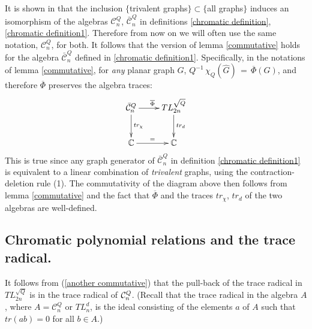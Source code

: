 \documentclass[11pt]{amsart}
\numberwithin{equation}{section}
\theoremstyle{definition}
\begin{document}
It is shown in \cite[Section 4]{FK} that the inclusion $\{$trivalent
graphs$\}\subset \{$all graphs$\}$ induces an isomorphism of the
algebras ${\mathcal C}^Q_n$, $\bar {\mathcal C}^Q_n$ in definitions \ref{chromatic definition},
\ref{chromatic
definition1}. Therefore from now on we will often use the same notation, ${\mathcal C}^Q_n$, for
both. It follows that the version of lemma \ref{commutative}
holds for the algebra $\bar{\mathcal C}^Q_n$ defined in \ref{chromatic
definition1}. Specifically, in the notations of lemma
\ref{commutative}, for {\em any} planar graph $G$, $Q^{-1}\,
{\chi}_Q(\widehat G)\, =\, \overline{\Phi}(G)$, and therefore $\overline{\Phi}$
preserves the algebra traces:
\begin{equation} \label{another commutative}
\xymatrix{ \bar{\mathcal C}_n^{\scriptsize Q}  \ar[d]^{tr_{\chi}} \ar[r]^{\overline{\Phi}} & TL_{2n}^{\sqrt Q}  \ar[d]^{tr_{d}}\\
{\mathbb C}\ar[r]^=  &  {\mathbb C} }\end{equation}
This is true since any graph generator of $\bar {\mathcal C}^Q_n$ in definition \ref{chromatic definition1} is equivalent
to a linear combination of {\em trivalent} graphs, using the contraction-deletion rule (1). The commutativity of the
diagram above then follows from lemma \ref{commutative} and the fact that $\overline{\Phi}$ and the traces ${tr_{\chi}}$,
$tr_{d}$ of the two algebras are well-defined.





\subsection{Chromatic polynomial relations and the trace radical.}
It follows from (\ref{another commutative}) that the pull-back of the trace radical in $TL_{2n}^{\sqrt Q}$ is in the
trace radical of ${\mathcal C}_n^{\scriptsize Q}$. (Recall that the trace radical in the algebra $A$,
where $A={\mathcal C}_n^Q$ or $TL^d_n$,
is the ideal consisting of the elements $a$ of $A$ such that $tr(ab)=0$ for all $b\in A$.)
\end{document}
